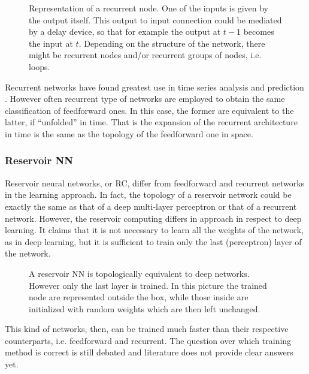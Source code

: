 \begin{figure}[ht]
	\centering
	
	\caption{%
		Representation of a recurrent node.
		One of the inputs is given by the output itself.
		This output to input connection could be mediated by a delay device, so that for example the output at $t-1$ becomes the input at $t$.
		Depending on the structure of the network, there might be recurrent nodes and/or recurrent groups of nodes, i.e. loops.
		}
	\label{fig:RecurrentNN}
\end{figure}

Recurrent networks have found greatest use in time series analysis and prediction \cite{duda2012pattern}.
However often recurrent type of networks are employed to obtain the same classification of feedforward ones.
In this case, the former are equivalent to the latter, if ``unfolded'' in time.
That is the expansion of the recurrent architecture in time is the same as the topology of the feedforward one in space.

\subsubsection{Reservoir NN}
\label{sssec:Reservoir_NN}
Reservoir neural networks, or \ac{RC}, differ from feedforward and recurrent networks in the learning approach.
In fact, the topology of a reservoir network could be exactly the same as that of a deep multi-layer perceptron or that of a recurrent network.
However, the reservoir computing differs in approach in respect to deep learning.
It claims that it is not necessary to learn all the weights of the network, as in deep learning, but it is sufficient to train only the last (perceptron) layer of the network.

\begin{figure}[ht]
	\centering
	
	\caption{A reservoir NN is topologically equivalent to deep networks. However only the last layer is trained. In this picture the trained node are represented outside the box, while those inside are initialized with random weights which are then left unchanged.}
	\label{fig:reservoirNN}
\end{figure}

\noindent This kind of networks, then, can be trained much faster than their respective counterparts, i.e. feedforward and recurrent.
The question over which training method is correct is still debated and literature does not provide clear answers yet.


